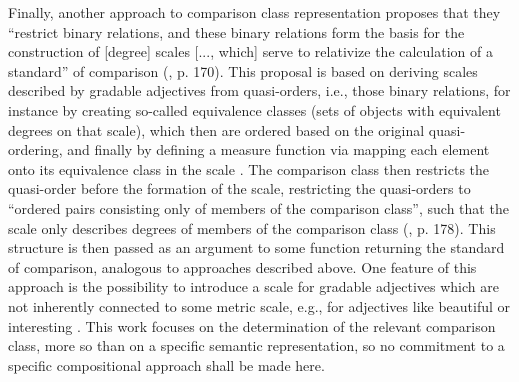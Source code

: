 Finally, another approach to comparison class representation proposes that they “restrict binary relations, and these binary relations form the basis for the construction of [degree] scales [..., which] serve to relativize the calculation of a standard” of comparison (\cite{Bale2011}, p. 170). This proposal is based on deriving scales described by gradable adjectives from quasi-orders, i.e., those binary relations, for instance by creating so-called equivalence classes (sets of objects with equivalent degrees on that scale), which then are ordered based on the original quasi-ordering, and finally by defining a measure function via mapping each element onto its equivalence class in the scale \parencite{Bale2011}. The comparison class then restricts the quasi-order before the formation of the scale, restricting the quasi-orders to “ordered pairs consisting only of members of the comparison class”, such that the scale only describes degrees of members of the comparison class (\cite{Bale2011}, p. 178). This structure is then passed as an argument to some function returning the standard of comparison, analogous to approaches described above. One feature of this approach is the possibility to introduce a scale for gradable adjectives which are not inherently connected to some metric scale, e.g., for adjectives like beautiful or interesting \parencite{Bale2011}.   
This work focuses on the determination of the relevant comparison class, more so than on a specific semantic representation, so no commitment to a specific compositional approach shall be made here. 

